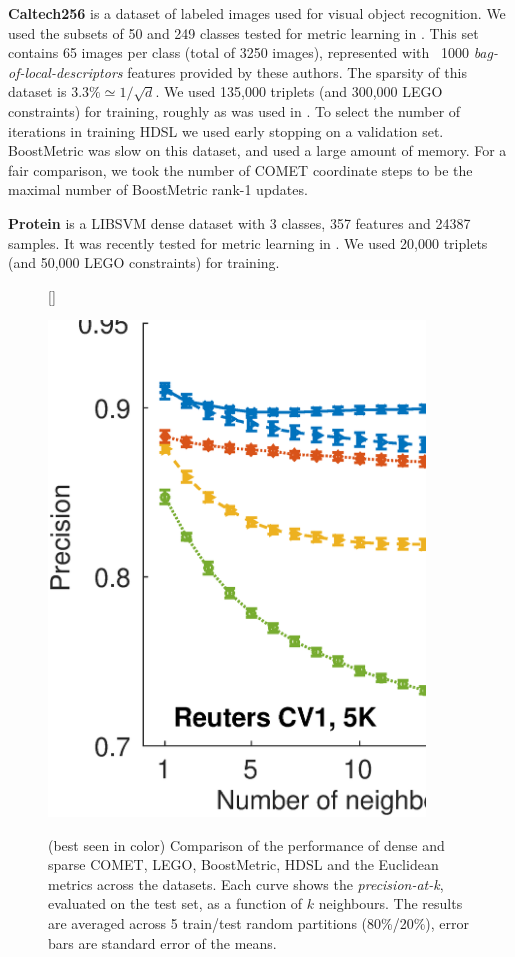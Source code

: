 \documentclass[twoside,11pt]{article}
\begin{document}
\textbf{Caltech256} is a dataset of labeled images used for visual object recognition. We used the subsets of 50 and 249 classes tested for metric learning in \citep{OASIS}. This set contains 65 images per class (total of 3250 images), represented with ~1000 \textit{bag-of-local-descriptors} features provided by these authors. The sparsity of this dataset is $3.3\% \simeq 1/\sqrt{d}$. We used 135,000 triplets (and 300,000 LEGO constraints) for training, roughly as was used in \citep{OASIS}. To select the number of iterations in training HDSL we used early stopping on a validation set. BoostMetric was slow on this dataset, and used a large amount of memory. For a fair comparison, we took the number of COMET coordinate steps to be the maximal number of BoostMetric rank-1 updates.

\textbf{Protein} is a LIBSVM \citep{libsvm} dense dataset with 3 classes, 357 features and 24387 samples. It was recently tested for metric learning in \citep{qian}. We used 20,000 triplets (and 50,000 LEGO constraints) for training.

\begin{figure}[ht, width=15cm]
\captionsetup{font=small}
[\FBwidth]
{\caption{(best seen in color) Comparison of the performance of dense and sparse COMET, LEGO, BoostMetric, HDSL and the Euclidean metrics across the datasets. Each curve shows the \textit{precision-at-k}, evaluated on the test set, as a function of $k$ neighbours. The results are averaged across 5 train/test random partitions (80\%/20\%), error bars are standard error of the means.}\label{precFig}}
{\includegraphics[width=10cm]{Precision_at_K_all_datasets}}
\end{figure}
\end{document}

